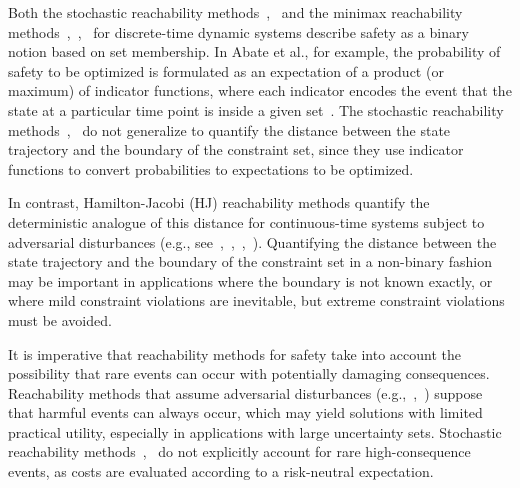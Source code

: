 \documentclass[letterpaper, 10 pt, conference]{ieeeconf}  %
\begin{document}
Both the stochastic reachability methods~\cite{abate2008probabilistic},~\cite{summers2010verification} and the minimax reachability methods~\cite{bertsekas1971control},~\cite{bertsekas1971minimax},~\cite{bertsekas2005dynamic} for discrete-time dynamic systems
describe safety as a binary notion based on set membership.
In Abate et al., for example, the probability of safety to be optimized is formulated as an expectation of a product (or maximum)
of indicator functions, where each indicator encodes the event that the state at a particular time point is inside a given set~\cite{abate2008probabilistic}.
The stochastic reachability methods~\cite{abate2008probabilistic},~\cite{summers2010verification} 
do not generalize to quantify the distance between the state trajectory and the boundary of the constraint set,
since they use indicator functions to convert probabilities to expectations to be optimized.

In contrast, Hamilton-Jacobi (HJ) reachability methods quantify the deterministic analogue of this distance
for continuous-time systems subject to adversarial disturbances 
(e.g., see~\cite{bansal2017hamilton},~\cite{herbert2017fastrack},~\cite{EECS-2018-41},~\cite{mitchell2005toolbox}).
Quantifying the distance between the state trajectory and the boundary of the constraint set in a non-binary fashion
may be important in applications where the boundary is not known exactly,
or where mild constraint violations are inevitable, but extreme constraint violations must be avoided.

It is imperative that reachability methods for safety take into account the possibility that rare events can occur
with potentially damaging consequences. 
Reachability methods that assume adversarial disturbances (e.g.,~\cite{bansal2017hamilton},~\cite{bertsekas1971minimax}) suppose that harmful events can always occur,
which may yield solutions with limited practical utility, especially in applications with large uncertainty sets.
Stochastic reachability methods~\cite{abate2008probabilistic},~\cite{summers2010verification} do not explicitly account for rare high-consequence events,
as costs are evaluated according to a risk-neutral expectation.
\end{document}
